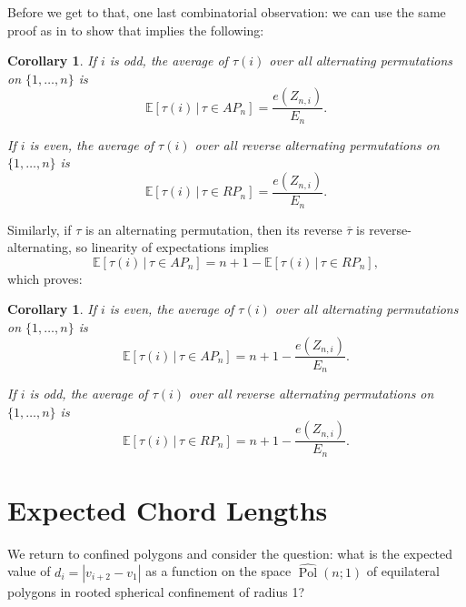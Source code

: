 \documentclass{article}
\newtheorem{corollary}[theorem]{Corollary}
\theoremstyle{definition}
\newcommand{\Polhat}{\widehat{\operatorname{Pol}}}
\begin{document}
Before we get to that, one last combinatorial observation: we can use the same proof as in  to  show that  implies the following:

\begin{corollary}\label{cor:expected ith entry}
	If $i$ is odd, the average of $\tau(i)$ over all alternating permutations on $\{1,\dots, n\}$ is
	\[
		\mathbb{E}[\tau(i) \,|\, \tau \in AP_n] = \frac{e(Z_{n,i})}{E_n}.
	\]

	If $i$ is even, the average of $\tau(i)$ over all reverse alternating permutations on $\{1,\dots, n\}$ is
	\[
		\mathbb{E}[\tau(i) \,|\, \tau \in RP_n] = \frac{e(Z_{n,i})}{E_n}.
	\]
\end{corollary}

Similarly, if $\tau$ is an alternating permutation, then its reverse $\overline{\tau}$ is reverse-alternating, so linearity of expectations implies
\[
	\mathbb{E}[\tau(i)\,|\, \tau \in AP_n] = n+1 - \mathbb{E}[\tau(i)\,|\, \tau \in RP_n],
\]
which proves:

\begin{corollary}\label{cor:expected ith entry pt 2}
	If $i$ is even, the average of $\tau(i)$ over all alternating permutations on $\{1,\dots, n\}$ is
	\[
		\mathbb{E}[\tau(i) \,|\, \tau \in AP_n] = n+1 - \frac{e(Z_{n,i})}{E_n}.
	\]

	If $i$ is odd, the average of $\tau(i)$ over all reverse alternating permutations on $\{1,\dots, n\}$ is
	\[
		\mathbb{E}[\tau(i) \,|\, \tau \in RP_n] = n+1 - \frac{e(Z_{n,i})}{E_n}.
	\]
\end{corollary}





\section{Expected Chord Lengths}
\label{sec:chord lengths}

We return to confined polygons and consider the question: what is the expected value of $d_i = |v_{i+2} - v_1|$ as a function on the space $\Polhat(n;1)$ of equilateral polygons in rooted spherical confinement of radius 1?
\end{document}
